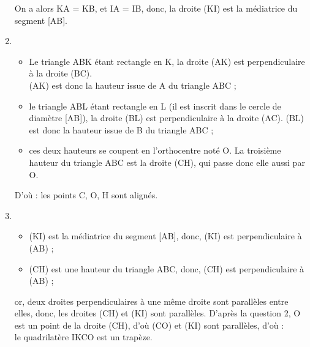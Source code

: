 \begin{enumerate}
\begin{itemize}
            \end{itemize}
            On a alors KA = KB, et IA = IB, donc, {\blue la droite (KI) est la médiatrice du segment [AB].}
         \item
            \begin{itemize}
                \item Le triangle ABK étant rectangle en K, la droite (AK) est perpendiculaire à la droite (BC). \\
                   (AK) est donc la hauteur issue de A du triangle ABC ;
                \item le triangle ABL étant rectangle en L (il est inscrit dans le cercle de diamètre [AB]), la droite (BL) est perpendiculaire à la droite (AC). (BL) est donc la hauteur issue de B du triangle ABC ;
                \item ces deux hauteurs se coupent en l'orthocentre noté O. La troisième hauteur du triangle ABC est la droite (CH), qui passe donc elle aussi par O.
            \end{itemize}
            D'où : {\blue les points C, O, H sont alignés.}
         \item
            \begin{itemize}
               \item (KI) est la médiatrice du segment [AB], donc, (KI) est perpendiculaire à (AB) ;
               \item (CH) est une hauteur du triangle ABC, donc, (CH) est perpendiculaire à (AB) ;
            \end{itemize}
            or, deux droites perpendiculaires à une même droite sont parallèles entre elles, donc, les droites (CH) et (KI) sont parallèles. D'après la question 2, O est un point de la droite (CH), d'où  (CO) et (KI) sont parallèles, d'où : \\
            {\blue le quadrilatère IKCO est un trapèze.}
   \end{enumerate}
